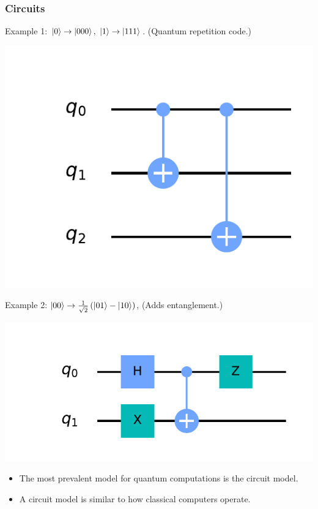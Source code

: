 \documentclass{beamer}
\renewcommand{\(}{\left(}
\renewcommand{\)}{\right)}
\renewcommand{\[}{\left[}
\renewcommand{\]}{\right]}
\begin{document}
\begin{frame}
    \frametitle{Circuits}
    Example 1:  $\ket{0} \rightarrow \ket{000},\ \ket{1} \rightarrow \ket{111} $. (Quantum repetition code.)
    \begin{center}
        \includegraphics[scale = 0.5, trim = 30 25 40 35, clip]{repetition_circ.pdf}
    \end{center}
    \pause
    Example 2: $\ket{00} \rightarrow \frac{1}{\sqrt{2}}\(\ket{01} - \ket{10} \)$, (Adds entanglement.)
    \begin{center}
    \includegraphics[scale = 0.5, trim = 30 25 40 35, clip]{add_ent.pdf}
    \end{center}
    \begin{itemize}
        \item The most prevalent model for quantum computations is the circuit model. 
        \item A circuit model is similar to how classical computers operate.
    \end{itemize}
\end{frame}
\end{document}
